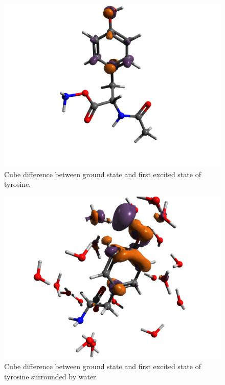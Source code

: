 \documentclass[]{interact}
\theoremstyle{plain}%
\theoremstyle{definition}
\theoremstyle{remark}
\begin{document}
\begin{figure}
	\includegraphics[width=\textwidth]{diff.png} 
	\caption{Cube difference between ground state and first excited state of tyrosine.}
	\label{cubediff}
\end{figure}

\begin{figure}
	\includegraphics[width=\textwidth]{diffH2O.png} 
	\caption{Cube difference between ground state and first excited state of tyrosine surrounded by water.}
	\label{cubediffH2O}
\end{figure}
\end{document}
